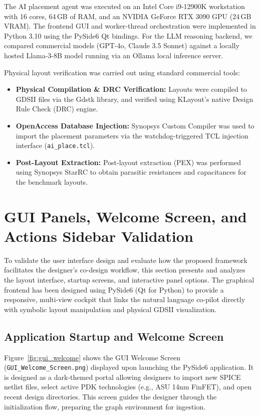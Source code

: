 The AI placement agent was executed on an Intel Core i9-12900K workstation with 16 cores, 64\,GB of RAM, and an NVIDIA GeForce RTX 3090 GPU (24\,GB VRAM). The frontend GUI and worker-thread orchestration were implemented in Python 3.10 using the PySide6 Qt bindings. For the LLM reasoning backend, we compared commercial models (GPT-4o, Claude 3.5 Sonnet) against a locally hosted Llama-3-8B model running via an Ollama local inference server.

Physical layout verification was carried out using standard commercial tools:
\begin{itemize}
    \item \textbf{Physical Compilation \& DRC Verification:} Layouts were compiled to GDSII files via the Gdstk library, and verified using KLayout's native Design Rule Check (DRC) engine.
    \item \textbf{OpenAccess Database Injection:} Synopsys Custom Compiler was used to import the placement parameters via the watchdog-triggered TCL injection interface (\texttt{ai\_place.tcl}).
    \item \textbf{Post-Layout Extraction:} Post-layout extraction (PEX) was performed using Synopsys StarRC to obtain parasitic resistances and capacitances for the benchmark layouts.
\end{itemize}



\section[GUI Panels and Interface Validation]{GUI Panels, Welcome Screen, and Actions Sidebar Validation}
\label{sec:gui_validation}

\noindent
To validate the user interface design and evaluate how the proposed framework facilitates the designer's co-design workflow, this section presents and analyzes the layout interface, startup screens, and interactive panel options. The graphical frontend has been designed using PySide6 (Qt for Python) to provide a responsive, multi-view cockpit that links the natural language co-pilot directly with symbolic layout manipulation and physical GDSII visualization.

\subsection{Application Startup and Welcome Screen}
\noindent
Figure~\ref{fig:gui_welcome} shows the GUI Welcome Screen (\texttt{GUI\_Welcome\_Screen.png}) displayed upon launching the PySide6 application. It is designed as a dark-themed portal allowing designers to import new SPICE netlist files, select active PDK technologies (e.g., ASU 14nm FinFET), and open recent design directories. This screen guides the designer through the initialization flow, preparing the graph environment for ingestion.

